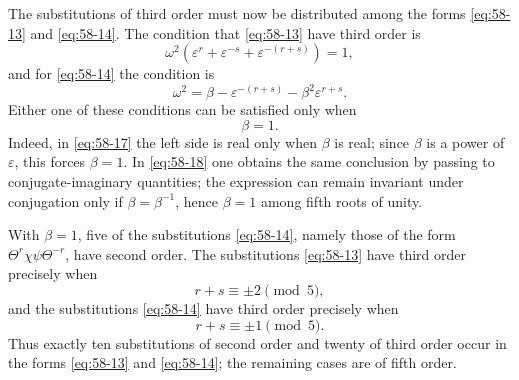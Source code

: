 \documentclass[11pt,a4paper]{article}
\newcommand{\eps}{\varepsilon}
\begin{document}
The substitutions of third order must now be distributed among the forms \eqref{eq:58-13} and \eqref{eq:58-14}.  The condition that \eqref{eq:58-13} have third order is
\begin{equation}\label{eq:58-17}
 \omega^2(\eps^r+\eps^{-s}+\eps^{-(r+s)})=1,
\end{equation}
and for \eqref{eq:58-14} the condition is
\begin{equation}\label{eq:58-18}
 \omega^2=\beta-\eps^{-(r+s)}-\beta^2\eps^{r+s}.
\end{equation}
Either one of these conditions can be satisfied only when
\[
 \beta=1.
\]
Indeed, in \eqref{eq:58-17} the left side is real only when \(\beta\) is real; since \(\beta\) is a power of \(\eps\), this forces \(\beta=1\).  In \eqref{eq:58-18} one obtains the same conclusion by passing to conjugate-imaginary quantities; the expression can remain invariant under conjugation only if \(\beta=\beta^{-1}\), hence \(\beta=1\) among fifth roots of unity.

With \(\beta=1\), five of the substitutions \eqref{eq:58-14}, namely those of the form \(\Theta^r\chi\psi\Theta^{-r}\), have second order.  The substitutions \eqref{eq:58-13} have third order precisely when
\begin{equation}\label{eq:58-third-a}
 r+s\equiv \pm 2 \pmod 5,
\end{equation}
and the substitutions \eqref{eq:58-14} have third order precisely when
\begin{equation}\label{eq:58-third-b}
 r+s\equiv \pm 1 \pmod 5.
\end{equation}
Thus exactly ten substitutions of second order and twenty of third order occur in the forms \eqref{eq:58-13} and \eqref{eq:58-14}; the remaining cases are of fifth order.
\end{document}
